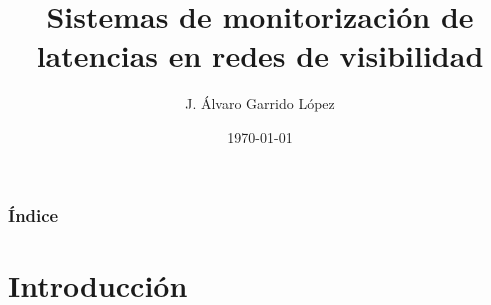 \documentclass{beamer}
\title[Redes de visibilidad]{Sistemas de monitorización de latencias en redes de visibilidad} %
\author{J. Álvaro Garrido López} %
\institute[UGR] %
{
Universidad de Granada \\ %
\medskip
Tutores: Javier Díaz y Miguel Jiménez\\
\medskip
Trabajo de Fin de Grado\\
}
\date{\today} %
\begin{document}
\begin{frame}
\titlepage %
\end{frame}

\begin{frame}
\frametitle{Índice} %
\tableofcontents %
\end{frame}




\section{Introducción}
\end{document}
